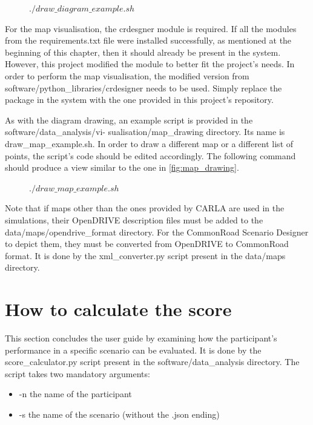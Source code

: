 \begin{figure} [h]
    \centering
    $./draw\_diagram\_example.sh$
\end{figure}

For the map visualisation, the crdesgner module is required. If all the modules from the requirements.txt file were installed successfully, as mentioned at the beginning of this chapter, then it should already be present in the system. However, this project modified the module to better fit the project's needs. In order to perform the map visualisation, the modified version from software/python\_libraries/crdesigner needs to be used. Simply replace the package in the system with the one provided in this project's repository.

As with the diagram drawing, an example script is provided in the software/data\_analysis/vi-
sualisation/map\_drawing directory. Its name is draw\_map\_example.sh. In order to draw a different map or a different list of points, the script's code should be edited accordingly. The following command should produce a view similar to the one in \autoref{fig:map_drawing}.

\begin{figure} [h]
    \centering
    $./draw\_map\_example.sh$
\end{figure}

Note that if maps other than the ones provided by CARLA are used in the simulations, their OpenDRIVE description files must be added to the data/maps/opendrive\_format directory. For the CommonRoad Scenario Designer to depict them, they must be converted from OpenDRIVE to CommonRoad format. It is done by the xml\_converter.py script present in the data/maps directory.


\section{How to calculate the score} \label{sect:b.6}
This section concludes the user guide by examining how the participant's performance in a specific scenario can be evaluated. It is done by the score\_calculator.py script present in the software/data\_analysis directory. The script takes two mandatory arguments:

\begin{itemize}
  \item -n the name of the participant
  \item -s the name of the scenario (without the .json ending)
\end{itemize}

